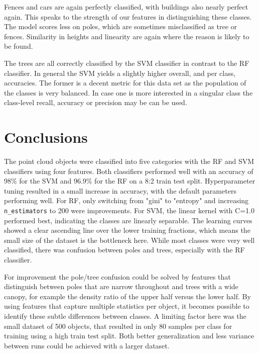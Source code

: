 \documentclass[a4paper,11pt]{scrartcl}
\begin{document}
Fences and cars are again perfectly classified, with buildings also nearly perfect again. This speaks to the strength of our features in distinguishing these classes. The model scores less on poles, which are sometimes misclassified as tree or fences. Similarity in heights and linearity are again where the reason is likely to be found. 

The trees are all correctly classified by the SVM classifier in contrast to the RF classifier. In general the SVM yields a slightly higher overall, and per class, accuracies. The former is a decent metric for this data set as the population of the classes is very balanced. In case one is more interested in a singular class the class-level recall, accuracy or precision may be can be used. 


\section{Conclusions}
The point cloud objects were classified into five categories with the RF and SVM classifiers using four features. Both classifiers performed well with an accuracy of 98\% for the SVM and 96.9\% for the RF on a 8:2 train test split. Hyperparameter tuning resulted in a small increase in accuracy, with the default parameters performing well. For RF, only switching from "gini" to "entropy" and increasing  \texttt{n\_estimators} to 200 were improvements. For SVM, the linear kernel with C=1.0 performed best, indicating the classes are linearly separable. The learning curves showed a clear ascending line over the lower training fractions, which means the small size of the dataset is the bottleneck here. While most classes were very well classified, there was confusion between poles and trees, especially with the RF classifier.

For improvement the pole/tree confusion could be solved by features that distinguish between poles that are narrow throughout and trees with a wide canopy, for example the density ratio of the upper half versus the lower half. By using features that capture multiple statistics per object, it becomes possible to identify these subtle differences between classes. A limiting factor here was the small dataset of 500 objects, that resulted in only 80 samples per class for training using a high train test split. Both better generalization and less variance between runs could be achieved with a larger dataset. 
\end{document}
